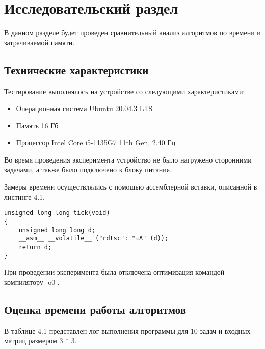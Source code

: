 \chapter{Исследовательский раздел}

В данном разделе будет проведен сравнительный анализ алгоритмов по
времени и затрачиваемой памяти.

\section{Технические характеристики}

Тестирование выполнялось на устройстве со следующими характеристиками: 

\begin{itemize}
	\item Операционная система Ubuntu 20.04.3 LTS \cite{ubuntu}
	\item Память 16 Гб
	\item Процессор Intel Core i5-1135G7 11th Gen, 2.40 Гц \cite{intel}
\end{itemize}

Во время проведения эксперимента устройство не было нагружено сторонними задачами, а также было подключено к блоку питания.

Замеры времени осуществлялись с помощью ассемблерной вставки, описанной в листинге 4.1.

\captionsetup{singlelinecheck = false, justification=raggedright}
\begin{lstlisting}[label=time, caption=Замер времени в микросекундах]
unsigned long long tick(void)
{
	unsigned long long d;
	__asm__ __volatile__ ("rdtsc": "=A" (d));
	return d;
}
\end{lstlisting}
\captionsetup{singlelinecheck = false, justification=centering}

При проведении эксперимента была отключена оптимизация командой компилятору -o0 \cite{std=c99}.

\section{Оценка времени работы алгоритмов}

В таблице 4.1 представлен лог выполнения программы для 10 задач и входных матриц размером 3 * 3.

